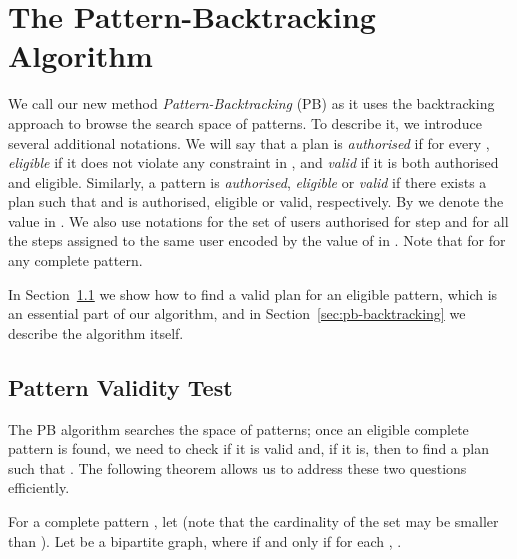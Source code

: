 \documentclass[runningheads,proof]{llncs}
\begin{document}
\section{The Pattern-Backtracking Algorithm}
\label{sec:pb}

We call our new method \emph{Pattern-Backtracking} (PB) as it uses the backtracking approach to browse the search space of patterns.
To describe it, we introduce several additional notations.
We will say that a plan  is \emph{authorised} if  for every , \emph{eligible} if it does not violate any constraint in , and \emph{valid} if it is both authorised and eligible.
Similarly, a pattern  is \emph{authorised}, \emph{eligible} or \emph{valid} if there exists a plan  such that  and  is authorised, eligible or valid, respectively.
By  we denote the value  in .  
We also use notations  for the set of users authorised for step  and  for all the steps assigned to the same user encoded by the value of  in \@.
Note that  for  for any complete pattern.





In Section~\ref{sec:pattern-validity} we show how to find a valid plan for an eligible pattern, which is an essential part of our algorithm, and in Section~\ref{sec:pb-backtracking} we describe the algorithm itself.


\subsection{Pattern Validity Test}
\label{sec:pattern-validity}

The PB algorithm searches the space of patterns; once an eligible complete pattern  is found, we need to check if it is valid and, if it is, then to find a plan  such that .
The following theorem allows us to address these two questions efficiently.

For a complete pattern , let  (note that the cardinality of the set  may be smaller than ).
Let  be a bipartite graph, where  if and only if  for each , . 
\end{document}
